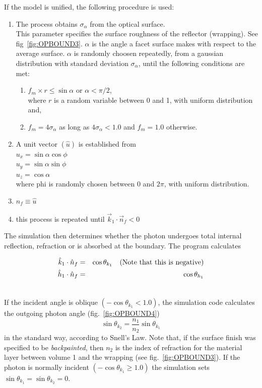 If the model is unified, the following procedure is used:

\begin{enumerate}
  \item{The process obtains $\sigma_\alpha$ from the optical
        surface. \\ This parameter specifies the surface roughness of
        the reflector (wrapping). See fig~\ref{fig:OPBOUND3}. $\alpha$
        is the angle a facet surface makes with respect to the average
        surface.  $\alpha$ is randomly choosen repeatedly, from a
        gaussian distribution with standard deviation $\sigma_\alpha$,
        until the following conditions are met:
    \begin{enumerate}
      \item{$f_m \times r \leq \sin\alpha$ or $\alpha < \pi/2$, \\ 
            where $r$ is a random variable between 0 and 1, with 
            uniform distribution and,}
      \item{$f_m = 4\sigma_\alpha$ as long as $4\sigma_\alpha < 1.0$
            and $f_m = 1.0$ otherwise.}
    \end{enumerate}
  }
  \item{A unit vector $(\hat{u})$ is established from \\
        $u_x = \sin\alpha \cos\phi$ \\
        $u_y = \sin\alpha \sin\phi$ \\
        $u_z = \cos\alpha$ \\
        where phi is randomly chosen between $0$ and $2\pi$, with uniform
        distribution.}
  \item{$\hat{n}_f \equiv \hat{u}$}
  \item{this process is repeated until $\vec{k}_1 \cdot \vec{n}_f < 0$}
\end{enumerate}

The simulation then determines whether the photon undergoes total internal
reflection, refraction or is absorbed at the boundary. The program calculates

\begin{eqnarray}
  \hat{k}_1 \cdot \hat{n}_f &=& \cos\theta_{k_1} ~~~{\rm (Note~that~this~is~negative)} \nonumber \\
  \hat{h}_1 \cdot \hat{n}_f &=& \cos\theta_{h_1} \nonumber \\ \nonumber
\end{eqnarray}

If the incident angle is oblique $(-\cos\theta_{k_1} < 1.0)$, the simulation
code calculates the outgoing photon angle (fig.~\ref{fig:OPBOUND4})
$$\sin\theta_{k_2} = \frac{n_1}{n_2}\sin\theta_{k_1}$$ in the standard
way, according to Snell's Law. Note that, if the surface finish was
specified to be {\em backpainted}, then $n_2$ is the index of
refraction for the material layer between volume 1 and the wrapping
(see fig.~\ref{fig:OPBOUND3}). If the photon is normally incident
$(-\cos\theta_{k_1} \geq 1.0)$ the simulation sets $\sin\theta_{k_1} =
\sin\theta_{k_2} = 0$.

